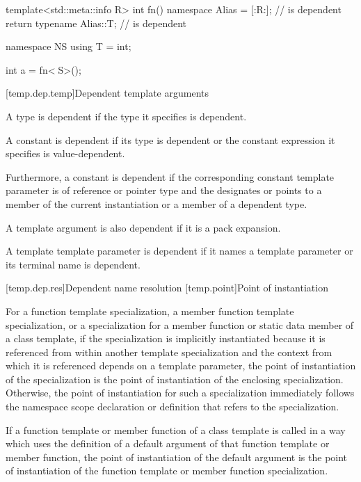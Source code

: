 \pnum
\begin{example}
\begin{codeblock}
template<std::meta::info R>
int fn() {
  namespace Alias = [:R:];          // \tcode{[:R:]} is dependent
  return typename Alias::T{};       //  is dependent
}

namespace NS {
  using T = int;
}

int a = fn<^^NS>();
\end{codeblock}
\end{example}

[temp.dep.temp]{Dependent template arguments}

\pnum
A type
is dependent if the type it specifies is dependent.

\pnum
A constant
is dependent if its type is dependent or the constant
expression it specifies is value-dependent.

\pnum
Furthermore, a constant
is dependent if the corresponding constant template parameter
is of reference or pointer type and the 
designates or points to a member of the current instantiation or a member of
a dependent type.

\pnum
A template argument is also dependent if it is a pack expansion.

\pnum
A template template parameter is dependent if
it names a template parameter or
its terminal name is dependent.

[temp.dep.res]{Dependent name resolution}
[temp.point]{Point of instantiation}

\pnum
{}%
For a function template specialization, a member function template
specialization, or a specialization for a member function or static data member
of a class template,
if the specialization is implicitly instantiated because it is referenced
from within another template specialization and
the context from which it is referenced depends on a template parameter,
the point of instantiation of the specialization is the point of instantiation
of the enclosing specialization.
Otherwise, the point of instantiation for such a specialization immediately
follows the namespace scope declaration
or definition that refers to the specialization.

\pnum
If a function template or member function of a class template is called
in a way which uses the definition of a default argument of that function
template or member function,
the point of instantiation of the default argument is the point of
instantiation of the function template or member function specialization.

